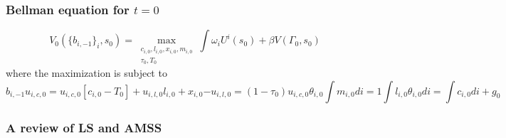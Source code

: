 \documentclass{beamer}
\begin{document}
\begin{frame}
\frametitle{Bellman equation for $t=0$}

 \begin{equation*}
V_0\left(\{b_{i,-1}\}_i, s_0\right) = \max_{\substack{c_{i,0},l_{i,0},x_{i,0},m_{i,0}\\ \tau_0,T_0}} {\int \omega_i U^i(s_0) + \beta V\left(\Gamma_0, s_0\right)}
\end{equation*}
where the maximization is subject to
\begin{subequations}
\begin{equation*}
\label{eq-imp}
b_{i,-1}u_{i,c,0} = u_{i,c,0}[c_{i,0}-T_0]+u_{i,l,0}l_{i,0}+x_{i,0}
\end{equation*}



\begin{equation*}
\label{eq-wages}
-u_{i,l,0}=(1-\tau_0) u_{i,c,0} \theta_{i,0}
\end{equation*}


\begin{equation*}
\label{eq-norm-m}
\int m_{i,0} di=1
\end{equation*}

\begin{equation*}
\label{eq-resources}
\int l_{i,0} \theta_{i,0} di = \int c_{i,0} di+g_0
\end{equation*}
\end{subequations}


\end{frame}

\begin{frame}
 \frametitle{A review of LS and AMSS}
\end{frame}
\end{document}
